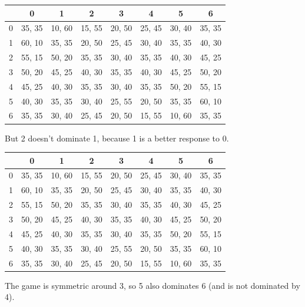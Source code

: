 \documentclass[
  14pt,
  letterpaper,
  ignorenonframetext,
  aspectratio=169,
]{beamer}
\begin{document}
\begin{frame}[plain]{}
\protect\hypertarget{section-2}{}
\begin{table}[!h]
\centering
\begin{tabular}[t]{>{}r|ccccccc}
\toprule
 & 0 & 1 & 2 & 3 & 4 & 5 & 6\\
\midrule
0 & 35, 35 & 10, 60 & 15, 55 & 20, 50 & 25, 45 & 30, 40 & 35, 35\\
1 & 60, 10 & 35, 35 & 20, 50 & 25, 45 & 30, 40 & 35, 35 & 40, 30\\
2 & 55, 15 & 50, 20 & 35, 35 & 30, 40 & 35, 35 & 40, 30 & 45, 25\\
3 & 50, 20 & 45, 25 & 40, 30 & 35, 35 & 40, 30 & 45, 25 & 50, 20\\
4 & 45, 25 & 40, 30 & 35, 35 & 30, 40 & 35, 35 & 50, 20 & 55, 15\\
5 & 40, 30 & 35, 35 & 30, 40 & 25, 55 & 20, 50 & 35, 35 & 60, 10\\
6 & 35, 35 & 30, 40 & 25, 45 & 20, 50 & 15, 55 & 10, 60 & 35, 35\\
\bottomrule
\end{tabular}
\end{table}

But 2 doesn't dominate 1, because 1 is a better response to 0.
\end{frame}

\begin{frame}[plain]{}
\protect\hypertarget{section-3}{}
\begin{table}[!h]
\centering
\begin{tabular}[t]{>{}r|ccccccc}
\toprule
 & 0 & 1 & 2 & 3 & 4 & 5 & 6\\
\midrule
0 & 35, 35 & 10, 60 & 15, 55 & 20, 50 & 25, 45 & 30, 40 & 35, 35\\
1 & 60, 10 & 35, 35 & 20, 50 & 25, 45 & 30, 40 & 35, 35 & 40, 30\\
2 & 55, 15 & 50, 20 & 35, 35 & 30, 40 & 35, 35 & 40, 30 & 45, 25\\
3 & 50, 20 & 45, 25 & 40, 30 & 35, 35 & 40, 30 & 45, 25 & 50, 20\\
4 & 45, 25 & 40, 30 & 35, 35 & 30, 40 & 35, 35 & 50, 20 & 55, 15\\
5 & 40, 30 & 35, 35 & 30, 40 & 25, 55 & 20, 50 & 35, 35 & 60, 10\\
6 & 35, 35 & 30, 40 & 25, 45 & 20, 50 & 15, 55 & 10, 60 & 35, 35\\
\bottomrule
\end{tabular}
\end{table}

The game is symmetric around 3, so 5 also dominates 6 (and is not
dominated by 4).
\end{frame}
\end{document}
